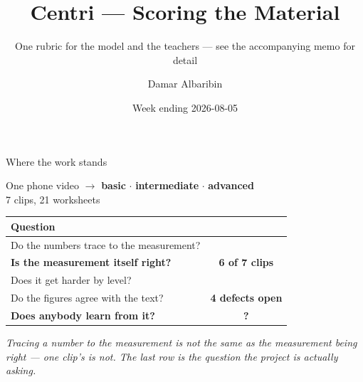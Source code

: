 \documentclass[aspectratio=169,10pt]{beamer}
\title{Centri --- Scoring the Material}
\subtitle{One rubric for the model and the teachers --- see the accompanying memo for detail}
\author{Damar Albaribin}
\institute{MSc Thesis --- advisor: Prof.\ Wu-Yuin Hwang}
\date{Week ending 2026-08-05}
\newcommand{\ok}{{\color{cApp}\textbf{\checkmark}}}
\newcommand{\takeaway}[1]{\vfill{\footnotesize\itshape\color{cGrey}#1\par}}
\begin{document}
\maketitle

\begin{frame}{Where the work stands}
\vfill
\begin{center}
{\Large One phone video $\rightarrow$ \textbf{\color{cBasic}basic} $\cdot$
\textbf{\color{cInter}intermediate} $\cdot$ \textbf{\color{cAdv}advanced}}\\[3pt]
{\footnotesize 7 clips, 21 worksheets}
\end{center}
\vfill
\begin{center}
\small
\renewcommand{\arraystretch}{1.6}
\begin{tabular}{@{}p{7.4cm}c@{}}
\toprule
\rowcolor{cPed!12}
\textbf{Question} & \\
\midrule
Do the numbers trace to the measurement? & \ok \\
\textbf{Is the measurement itself right?} & {\color{cAccent}\textbf{6 of 7 clips}} \\
Does it get harder by level? & \ok \\
Do the figures agree with the text? & {\color{cAccent}\textbf{4 defects open}} \\
\textbf{Does anybody learn from it?} & {\color{cAccent}\textbf{?}} \\
\bottomrule
\end{tabular}
\end{center}
\vfill
\takeaway{Tracing a number to the measurement is not the same as the measurement being right ---
one clip's is not. The last row is the question the project is actually asking.}
\end{frame}
\end{document}
